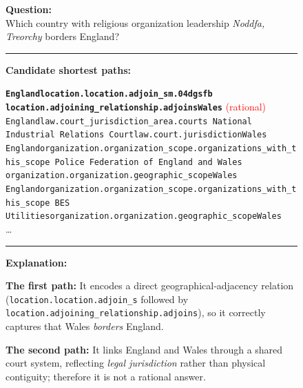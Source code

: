 \begin{figure}[t]
\begin{tcolorbox}[colback=gray!5!white,
                  colframe=gray!75!black,
                  title=WebQTest-923\_e3a2d3d50bac69d563de83a7f72eafc0]
\scriptsize


\textbf{Question:}\\
Which country with religious organization leadership \emph{Noddfa, Treorchy} borders England?

\rule{\linewidth}{0.4pt}

\textbf{Candidate shortest paths:}\\[2pt]
{\raggedright   %
\texttt{\textbf{England\patharrow location.location.adjoin\_s\patharrow m.04dgsfb\patharrow
location.adjoining\_relationship.adjoins\patharrow Wales}}\hfill
\textcolor{red}{(rational)}\\[6pt]

\texttt{England\patharrow law.court\_jurisdiction\_area.courts\patharrow
National Industrial Relations Court\patharrow law.court.jurisdiction\patharrow Wales}\\[6pt]

\texttt{England\patharrow organization.organization\_scope.organizations\_with\_this\_scope\patharrow
Police Federation of England and Wales\patharrow
organization.organization.geographic\_scope\patharrow Wales}\\[6pt]

\texttt{England\patharrow organization.organization\_scope.organizations\_with\_this\_scope\patharrow
BES Utilities\patharrow organization.organization.geographic\_scope\patharrow Wales}\\[6pt]

\ldots %
\par}

\rule{\linewidth}{0.4pt}

\textbf{Explanation:}\\[2pt]
{\raggedright
\textbf{The first path:} It encodes a direct geographical‐adjacency relation (\texttt{location.location.adjoin\_s}
followed by \texttt{location.adjoining\_relationship.adjoins}), so it
correctly captures that Wales \emph{borders} England.\par\vspace{6pt}

\textbf{The second path:} It links England and Wales through a shared court
system, reflecting \emph{legal jurisdiction} rather than physical
contiguity; therefore it is not a rational answer.\par\vspace{6pt}

}
\end{tcolorbox}
\end{figure}
